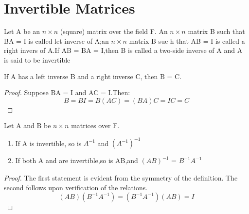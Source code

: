 \section{Invertible Matrices}

\begin{definition}
	Let A be an $n \times n$ (square) matrix over the field F. An $n \times n$ matrix B such that BA = I is called let inverse of A;an $n \times n$ matrix B suc h that AB = I is called a right invers of A.If AB = BA = I,then B is called a two-side inverse of A and A is said to be invertible
\end{definition}

\begin{lemma}
	If A has a left inverse B and a right inverse C, then B = C.
	\begin{proof}
		Suppose BA = I and AC = I.Then: \[
			B = BI = B(AC) = (BA)C = IC = C
		\]
	\end{proof}
\end{lemma}

\begin{theorem}
	Let A and B be $n \times n$ matrices over F.
	\begin{enumerate}
		\item If A is invertible, so is $A_{}^{-1}$ and $(A_{}^{-1})^{-1}$
		\item If both A and  are invertible,so is AB,and $(AB)_{}^{-1}$ = $B_{}^{-1}A_{}^{-1}$

	\end{enumerate}
	\begin{proof}
		The first statement is evident from the symmetry of the definition. The second follows upon verification of the relations.
		\[
			(AB)(B_{}^{-1}A_{}^{-1}) = (B_{}^{-1}A_{}^{-1})(AB) = I
		\]
	\end{proof}
\end{theorem}

